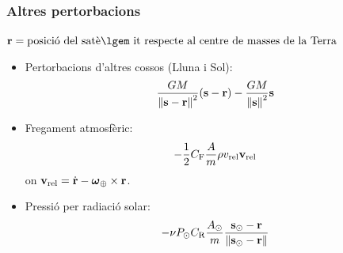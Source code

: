 \documentclass{beamer} %
\begin{document}
\begin{frame}
  \frametitle{Altres pertorbacions}
  $\vf{r} = \text{posició del satè\lgem it respecte al centre de masses de la Terra}$

  \vspace{0.25cm}
  \begin{itemize}
    \item<1-> Pertorbacions d'altres cossos (Lluna i Sol):
      $$\frac{GM}{\left\|\boldsymbol{\mathrm{s}}-\boldsymbol{\mathrm{r}}\right\|^2}(\boldsymbol{\mathrm{s}}-\boldsymbol{\mathrm{r}}) - \frac{GM}{\left\|\boldsymbol{\mathrm{s}}\right\|^2}\boldsymbol{\mathrm{s}}$$
    \item<2-> Fregament atmosfèric: $$-\frac{1}{2}C_\mathrm{F} \frac{A}{m}\rho v_\mathrm{rel}\boldsymbol{\mathrm{v}}_\mathrm{rel}$$
      on $\boldsymbol{\mathrm{v}}_\mathrm{rel}=\dot{\boldsymbol{\mathrm{r}}}-\boldsymbol{\mathrm{\omega}}_\oplus\times\boldsymbol{\mathrm{r}}$.
    \item<3-> Pressió per radiació solar: $$
        -\nu P_\odot C_\mathrm{R} \frac{A_\odot}{m} \frac{\boldsymbol{\mathrm{s}}_\odot-\boldsymbol{\mathrm{r}}}{\left\|\boldsymbol{\mathrm{s}}_\odot-\boldsymbol{\mathrm{r}}\right\|}
      $$
  \end{itemize}
\end{frame}
\end{document}
